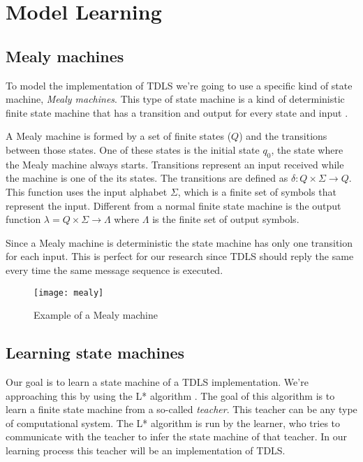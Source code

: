 \section{Model Learning}\label{modellearning}

\subsection{Mealy machines}

To model the implementation of TDLS we're going to use a specific kind of state machine, \emph{Mealy machines}. This type of state machine is a kind of deterministic finite state machine that has a transition and output for every state and input \cite{Mealy:1955}.

A Mealy machine is formed by a set of finite states (\(Q\)) and the transitions between those states. One of these states is the initial state \(q_0\), the state where the Mealy machine always starts. Transitions represent an input received while the machine is one of the its states. The transitions are defined as \(\delta : Q \times \Sigma \to Q\). This function uses the input alphabet \(\Sigma\), which is a finite set of symbols that represent the input. Different from a normal finite state machine is the output function \(\lambda = Q \times \Sigma \to \Lambda\) where \(\Lambda\) is the finite set of output symbols.

Since a Mealy machine is deterministic the state machine has only one transition for each input. This is perfect for our research since TDLS should reply the same every time the same message sequence is executed.

\begin{figure}[!h]
	\centering
	\texttt{[image: mealy]}
	\caption{Example of a Mealy machine}
	\label{fig:mealymachine}
\end{figure}

\subsection{Learning state machines}

Our goal is to learn a state machine of a TDLS implementation. We're approaching this by using the L* algorithm \cite{lstar}. The goal of this algorithm is to learn a finite state machine from a so-called \emph{teacher}. This teacher can be any type of computational system.
The L* algorithm is run by the learner, who tries to communicate with the teacher to infer the state machine of that teacher. In our learning process this teacher will be an implementation of TDLS.

